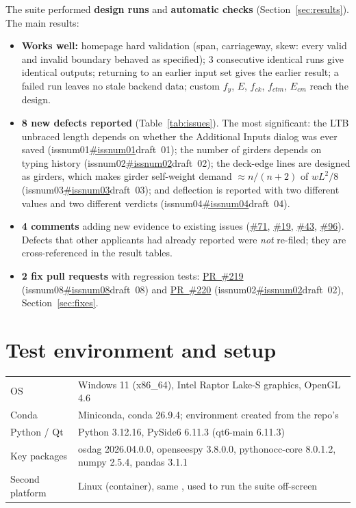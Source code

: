 \documentclass[11pt,a4paper]{article}
\newcommand{\code}[1]{\texttt{\detokenize{#1}}}
\newcommand{\issue}[1]{\ifcsname issnum#1\endcsname\href{https://github.com/Nidhikhare12/OsdagBridge/issues/\csname issnum#1\endcsname}{\#\csname issnum#1\endcsname}\else draft~#1\fi}
\newcommand{\gh}[1]{\href{https://github.com/Nidhikhare12/OsdagBridge/issues/#1}{\##1}}
\newcommand{\pr}[1]{\href{https://github.com/Nidhikhare12/OsdagBridge/pull/#1}{PR~\##1}}
\begin{document}
\noindent The suite performed \textbf{design runs} and \textbf{automatic checks} (Section~\ref{sec:results}). The main results:
\begin{itemize}
\item \textbf{Works well:} homepage hard validation (span, carriageway, skew: every valid and invalid boundary behaved as specified); 3 consecutive identical runs give identical outputs; returning to an earlier input set gives the earlier result; a failed run leaves no stale backend data; custom $f_y$, $E$, $f_{ck}$, $f_{ctm}$, $E_{cm}$ reach the design.
\item \textbf{8 new defects reported} (Table~\ref{tab:issues}). The most significant: the LTB unbraced length depends on whether the Additional Inputs dialog was ever saved (\issue{01}); the number of girders depends on typing history (\issue{02}); the deck-edge lines are designed as girders, which makes girder self-weight demand $\approx n/(n+2)$ of $wL^2/8$ (\issue{03}); and deflection is reported with two different values and two different verdicts (\issue{04}).
\item \textbf{4 comments} adding new evidence to existing issues (\gh{71}, \gh{19}, \gh{43}, \gh{96}). Defects that other applicants had already reported were \emph{not} re-filed; they are cross-referenced in the result tables.
\item \textbf{2 fix pull requests} with regression tests: \pr{219} (\issue{08}) and \pr{220} (\issue{02}), Section~\ref{sec:fixes}.
\end{itemize}

\section{Test environment and setup}
\begin{tabularx}{\linewidth}{@{}lX@{}}
\toprule
OS & Windows 11 (x86\_64), Intel Raptor Lake-S graphics, OpenGL 4.6\\
Conda & Miniconda, conda 26.9.4; environment created from the repo's \code{environment.yml}\\
Python / Qt & Python 3.12.16, PySide6 6.11.3 (qt6-main 6.11.3)\\
Key packages & osdag 2026.04.0.0, openseespy 3.8.0.0, pythonocc-core 8.0.1.2, numpy 2.5.4, pandas 3.1.1\\
Second platform & Linux (container), same \code{environment.yml}, used to run the suite off-screen\\
\bottomrule
\end{tabularx}
\end{document}
